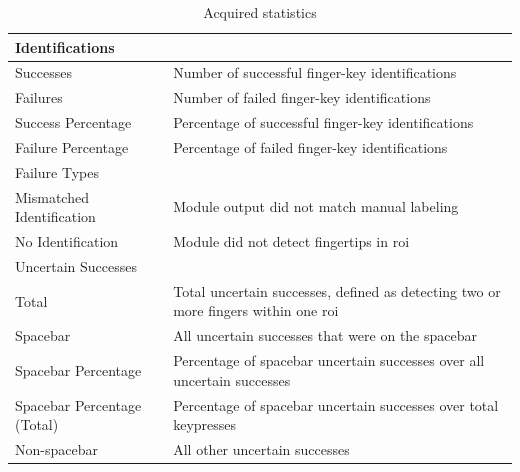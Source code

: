 \documentclass{report}
\begin{document}
\begin{table}[H]
	\small
	\centering
	\caption{\label{tab:acquired-stats}Acquired statistics}
	\begin{tabular}{ p{} p{} }
		\toprule
		Identifications                                                                                                                    \\
		\midrule
		Successes                                & Number of successful finger-key identifications                                         \\
		Failures                                 & Number of failed finger-key identifications                                             \\
		Success Percentage                       & Percentage of successful finger-key identifications                                     \\
		Failure Percentage                       & Percentage of failed finger-key identifications
		\\[0.25cm]
		\midrule
		Failure Types                                                                                                                      \\
		\midrule
		Mismatched Identification                & Module output did not match manual labeling                                             \\
		No Identification                        & Module did not detect fingertips in \ac{roi}
		\\[0.25cm]
		\midrule
		Uncertain Successes                                                                                                                \\
		\midrule
		Total                                    & Total uncertain successes, defined as detecting two or more fingers within one \ac{roi} \\
		Spacebar                                 & All uncertain successes that were on the spacebar                                       \\
		Spacebar Percentage                      & Percentage of spacebar uncertain successes over all uncertain successes                 \\
		Spacebar Percentage (Total)              & Percentage of spacebar uncertain successes over total keypresses                        \\
		Non-spacebar                             & All other uncertain successes                                                           \\

\end{tabular}
\end{table}
\end{document}

